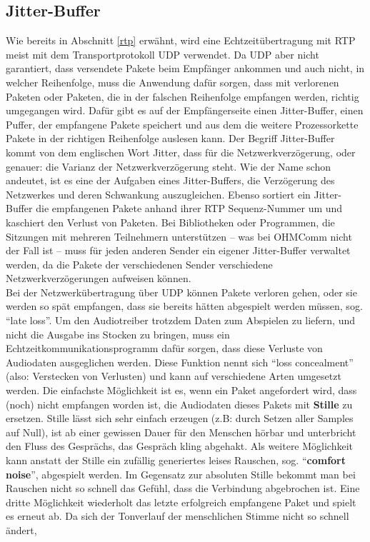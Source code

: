 \subsection{Jitter-Buffer}
Wie bereits in Abschnitt \ref{rtp} erwähnt, wird eine Echtzeitübertragung mit RTP meist mit dem Transportprotokoll UDP verwendet. Da UDP aber nicht garantiert, dass versendete Pakete beim Empfänger ankommen und auch nicht, in welcher Reihenfolge, muss die Anwendung dafür sorgen, dass mit verlorenen Paketen oder Paketen, die in der falschen Reihenfolge empfangen werden, richtig umgegangen wird. Dafür gibt es auf der Empfängerseite einen Jitter-Buffer, einen Puffer, der empfangene Pakete speichert und aus dem die weitere Prozessorkette Pakete in der richtigen Reihenfolge auslesen kann. Der Begriff Jitter-Buffer kommt von dem englischen Wort Jitter, dass für die Netzwerkverzögerung, oder genauer: die Varianz der Netzwerkverzögerung steht. Wie der Name schon andeutet, ist es eine der Aufgaben eines Jitter-Buffers, die Verzögerung des Netzwerkes und deren Schwankung auszugleichen. Ebenso sortiert ein Jitter-Buffer die empfangenen Pakete anhand ihrer RTP Sequenz-Nummer um und kaschiert den Verlust von Paketen. Bei Bibliotheken oder Programmen, die Sitzungen mit mehreren Teilnehmern unterstützen -- was bei OHMComm nicht der Fall ist -- muss für jeden anderen Sender ein eigener Jitter-Buffer verwaltet werden, da die Pakete der verschiedenen Sender verschiedene Netzwerkverzögerungen aufweisen können.
\\
Bei der Netzwerkübertragung über UDP können Pakete verloren gehen, oder sie werden so spät empfangen, dass sie bereits hätten abgespielt werden müssen, sog. \enquote{late loss}. Um den Audiotreiber trotzdem Daten zum Abspielen zu liefern, und nicht die Ausgabe ins Stocken zu bringen, muss ein Echtzeitkommunikationsprogramm dafür sorgen, dass diese Verluste von Audiodaten ausgeglichen werden. Diese Funktion nennt sich \enquote{loss concealment} (also: Verstecken von Verlusten) und kann auf verschiedene Arten umgesetzt werden. Die einfachste Möglichkeit ist es, wenn ein Paket angefordert wird, dass (noch) nicht empfangen worden ist, die Audiodaten dieses Pakets mit \textbf{Stille} zu ersetzen. Stille lässt sich sehr einfach erzeugen (z.B: durch Setzen aller Samples auf Null), ist ab einer gewissen Dauer für den Menschen hörbar und unterbricht den Fluss des Gesprächs, das Gespräch kling abgehakt. Als weitere Möglichkeit kann anstatt der Stille ein zufällig generiertes leises Rauschen, sog. \enquote{\textbf{comfort noise}}, abgespielt werden. Im Gegensatz zur absoluten Stille bekommt man bei Rauschen nicht so schnell das Gefühl, dass die Verbindung abgebrochen ist. Eine dritte Möglichkeit wiederholt das letzte erfolgreich empfangene Paket und spielt es erneut ab. Da sich der Tonverlauf der menschlichen Stimme nicht so schnell ändert, %
